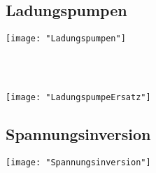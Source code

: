 \subsection{Ladungspumpen}
\begin{minipage}[t]{0.3\textwidth}
	\vspace{0pt}								%
	\texttt{[image: "Ladungspumpen"]}
\end{minipage}\hspace{0.05\textwidth}
\begin{minipage}[t]{0.3\textwidth}
	\vspace{0pt}
	\\
	\\
\end{minipage}
\begin{minipage}[t]{0.3\textwidth}
	\vspace{0pt}
	\texttt{[image: "LadungspumpeErsatz"]}
\end{minipage}
\vspace{2mm}


\subsection{Spannungsinversion}
\begin{minipage}[t]{0.3\textwidth}
	\vspace{0pt}								%
	\texttt{[image: "Spannungsinversion"]}
\end{minipage}\hspace{0.05\textwidth}
\begin{minipage}[t]{0.3\textwidth}
	\vspace{0pt}
\end{minipage}
\begin{minipage}[t]{0.3\textwidth}
	\vspace{0pt}
	
\end{minipage}
\vspace{2mm}

